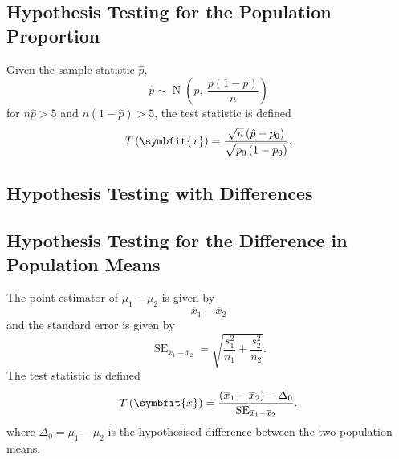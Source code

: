 \documentclass{article}
\begin{document}
\begin{multicols}{3}
\subsection{Hypothesis Testing for the Population Proportion}
Given the sample statistic \(\hat{p}\),
\begin{equation*}
    \hat{p} \sim \operatorname{N}\left( p,\: \frac{p\left( 1 - p \right)}{n} \right)
\end{equation*}
for \(n \hat{p} > 5\) and \(n \left( 1 - \hat{p} \right) > 5\),
the test statistic is defined
\begin{equation*}
    T\left( \symbfit{x} \right) = \frac{\sqrt{n} \left( \hat{p} - p_0 \right)}{\sqrt{p_0 \left( 1 - p_0 \right)}}.
\end{equation*}
\subsection{Hypothesis Testing with Differences}
\subsection{Hypothesis Testing for the Difference in Population Means}
The point estimator of \(\mu_1 - \mu_2\) is given by
\begin{equation*}
    \overline{x}_1 - \overline{x}_2
\end{equation*}
and the standard error is given by
\begin{equation*}
    \operatorname{SE}_{\overline{x}_1 - \overline{x}_2} = \sqrt{\frac{s_1^2}{n_1} + \frac{s_2^2}{n_2}}.
\end{equation*}
The test statistic is defined
\begin{equation*}
    T\left( \symbfit{x} \right) = \frac{\left( \overline{x}_1 - \overline{x}_2 \right) - \Delta_0}{\operatorname{SE}_{\overline{x}_1 - \overline{x}_2}}.
\end{equation*}
where \(\Delta_0 = \mu_1 - \mu_2\) is the hypothesised difference between the two population means.

\end{multicols}
\end{document}
